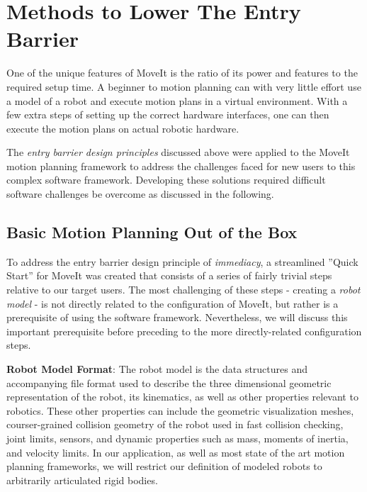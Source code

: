 \documentclass[10pt,journal,compsoc]{joser1}
\begin{document}
{\section{Methods to Lower The Entry Barrier}
\label{sec::lowering_barriers}

One of the unique features of MoveIt is the ratio of its power and features to the required setup time. A beginner to motion planning can with very little effort use a model of a robot and execute motion plans in a virtual environment. With a few extra steps of setting up the correct hardware interfaces, one can then execute the motion plans on actual robotic hardware.

The \textit{entry barrier design principles} discussed above were applied to the MoveIt motion planning framework to address the challenges faced for new users to this complex software framework. Developing these solutions required difficult software challenges be overcome as discussed in the following.

\subsection{Basic Motion Planning Out of the Box}

To address the entry barrier design principle of \textit{immediacy}, a streamlined ''Quick Start'' for MoveIt was created that consists of a series of fairly trivial steps relative to our target users. The most challenging of these steps - creating a \textit{robot model} - is not directly related to the configuration of MoveIt, but rather is a prerequisite of using the software framework. Nevertheless, we will discuss this important prerequisite before preceding to the more directly-related configuration steps. 

{\bf Robot Model Format}: The robot model is the data structures and accompanying file format used to describe the three dimensional geometric representation of the robot, its kinematics, as well as other properties relevant to robotics. These other properties can include the geometric visualization meshes, courser-grained collision geometry of the robot used in fast collision checking, joint limits, sensors, and dynamic properties such as mass, moments of inertia, and velocity limits. In our application, as well as most state of the art motion planning frameworks, we will restrict our definition of modeled robots to arbitrarily articulated rigid bodies.

}
\end{document}
